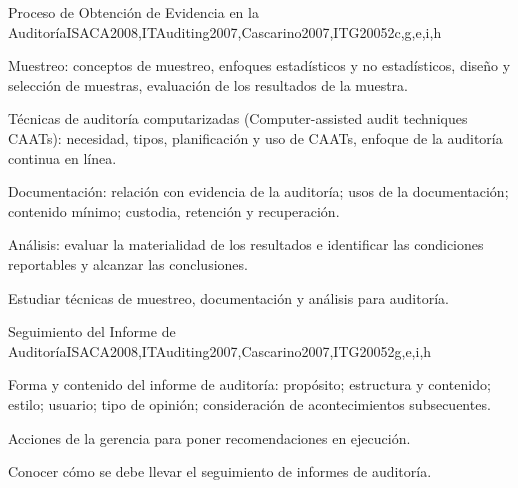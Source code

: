 \begin{syllabus}
	\begin{unit}{Proceso de Obtención de  Evidencia en la Auditoría}{}{ISACA2008,ITAuditing2007,Cascarino2007,ITG2005}{2}{c,g,e,i,h}
	\begin{topics}
	\item Muestreo: conceptos de muestreo, enfoques estadísticos y no estadísticos, diseño y selección de muestras, evaluación de los resultados de la muestra.
	\item Técnicas de auditoría computarizadas (Computer-assisted audit techniques CAATs): necesidad, tipos, planificación y uso de CAATs, enfoque de la auditoría continua en línea.
	\item Documentación: relación con evidencia de la auditoría; usos de la documentación; contenido mínimo; custodia, retención y recuperación.
	\item Análisis: evaluar la materialidad de los resultados e identificar las condiciones reportables y alcanzar las conclusiones.
	\end{topics}
	\begin{learningoutcomes}
	\item Estudiar técnicas de muestreo, documentación y análisis para auditoría.
	\end{learningoutcomes}
	\end{unit}
	
	\begin{unit}{Seguimiento del Informe de Auditoría}{}{ISACA2008,ITAuditing2007,Cascarino2007,ITG2005}{2}{g,e,i,h}
	\begin{topics}
	\item Forma y contenido del informe de auditoría: propósito; estructura y contenido; estilo; usuario; tipo de opinión; consideración de acontecimientos subsecuentes.
	\item Acciones de la gerencia para poner recomendaciones en ejecución.
	\end{topics}
	\begin{learningoutcomes}
	\item Conocer cómo se debe llevar el seguimiento de informes de auditoría.
	\end{learningoutcomes}
	\end{unit}
	

\end{syllabus}
